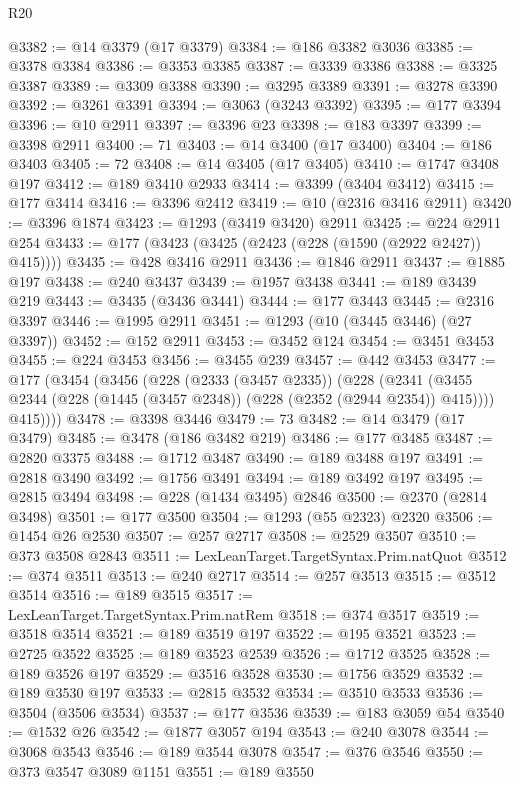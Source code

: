\begin{lexlean}{R20}
\begin{coremodule}
@3382 := @14 @3379 (@17 @3379)
@3384 := @186 @3382 @3036
@3385 := @3378 @3384
@3386 := @3353 @3385
@3387 := @3339 @3386
@3388 := @3325 @3387
@3389 := @3309 @3388
@3390 := @3295 @3389
@3391 := @3278 @3390
@3392 := @3261 @3391
@3394 := @3063 (@3243 @3392)
@3395 := @177 @3394
@3396 := @10 @2911
@3397 := @3396 @23
@3398 := @183 @3397
@3399 := @3398 @2911
@3400 := 71
@3403 := @14 @3400 (@17 @3400)
@3404 := @186 @3403
@3405 := 72
@3408 := @14 @3405 (@17 @3405)
@3410 := @1747 @3408 @197
@3412 := @189 @3410 @2933
@3414 := @3399 (@3404 @3412)
@3415 := @177 @3414
@3416 := @3396 @2412
@3419 := @10 (@2316 @3416 @2911)
@3420 := @3396 @1874
@3423 := @1293 (@3419 @3420) @2911
@3425 := @224 @2911 @254
@3433 := @177 (@3423 (@3425 (@2423 (@228 (@1590 (@2922 @2427)) @415))))
@3435 := @428 @3416 @2911
@3436 := @1846 @2911
@3437 := @1885 @197
@3438 := @240 @3437
@3439 := @1957 @3438
@3441 := @189 @3439 @219
@3443 := @3435 (@3436 @3441)
@3444 := @177 @3443
@3445 := @2316 @3397
@3446 := @1995 @2911
@3451 := @1293 (@10 (@3445 @3446) (@27 @3397))
@3452 := @152 @2911
@3453 := @3452 @124
@3454 := @3451 @3453
@3455 := @224 @3453
@3456 := @3455 @239
@3457 := @442 @3453
@3477 := @177
    (@3454
      (@3456
        (@228
          (@2333 (@3457 @2335))
          (@228
            (@2341 (@3455 @2344 (@228 (@1445 (@3457 @2348)) (@228 (@2352 (@2944 @2354)) @415))))
            @415))))
@3478 := @3398 @3446
@3479 := 73
@3482 := @14 @3479 (@17 @3479)
@3485 := @3478 (@186 @3482 @219)
@3486 := @177 @3485
@3487 := @2820 @3375
@3488 := @1712 @3487
@3490 := @189 @3488 @197
@3491 := @2818 @3490
@3492 := @1756 @3491
@3494 := @189 @3492 @197
@3495 := @2815 @3494
@3498 := @228 (@1434 @3495) @2846
@3500 := @2370 (@2814 @3498)
@3501 := @177 @3500
@3504 := @1293 (@55 @2323) @2320
@3506 := @1454 @26 @2530
@3507 := @257 @2717
@3508 := @2529 @3507
@3510 := @373 @3508 @2843
@3511 := LexLeanTarget.TargetSyntax.Prim.natQuot
@3512 := @374 @3511
@3513 := @240 @2717
@3514 := @257 @3513
@3515 := @3512 @3514
@3516 := @189 @3515
@3517 := LexLeanTarget.TargetSyntax.Prim.natRem
@3518 := @374 @3517
@3519 := @3518 @3514
@3521 := @189 @3519 @197
@3522 := @195 @3521
@3523 := @2725 @3522
@3525 := @189 @3523 @2539
@3526 := @1712 @3525
@3528 := @189 @3526 @197
@3529 := @3516 @3528
@3530 := @1756 @3529
@3532 := @189 @3530 @197
@3533 := @2815 @3532
@3534 := @3510 @3533
@3536 := @3504 (@3506 @3534)
@3537 := @177 @3536
@3539 := @183 @3059 @54
@3540 := @1532 @26
@3542 := @1877 @3057 @194
@3543 := @240 @3078
@3544 := @3068 @3543
@3546 := @189 @3544 @3078
@3547 := @376 @3546
@3550 := @373 @3547 @3089 @1151
@3551 := @189 @3550

\end{coremodule}
\end{lexlean}
